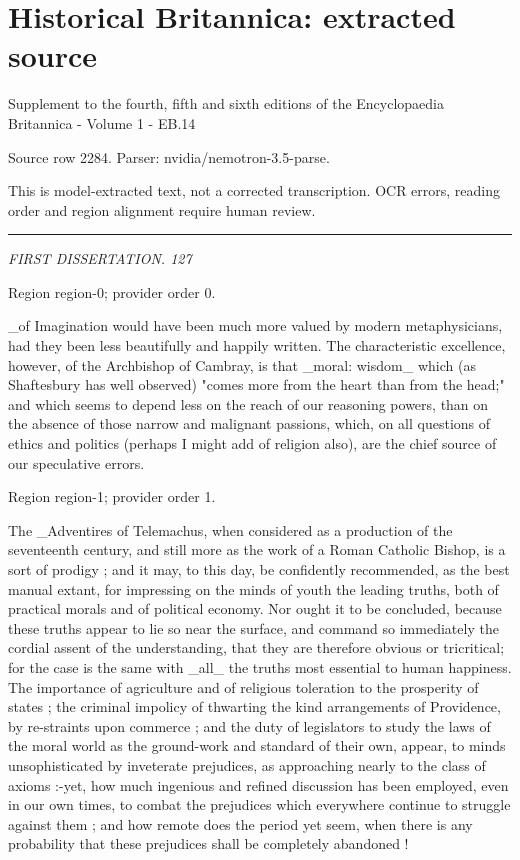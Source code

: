 \documentclass[11pt]{article}
\begin{document}
\section*{Historical Britannica: extracted source}
Supplement to the fourth, fifth and sixth editions of the Encyclopaedia Britannica - Volume 1 - EB.14\par
{\small Source row 2284. Parser: nvidia/nemotron-3.5-parse.\par}
{\small This is model-extracted text, not a corrected transcription. OCR errors, reading order and region alignment require human review.\par}
\hrule\medskip
{\small\itshape FIRST DISSERTATION. 127\par}

{\scriptsize\color{gray} Region region-0; provider order 0.\par}
\medskip

\_of Imagination would have been much more valued by modern metaphysicians, had they been less beautifully and happily written. The characteristic excellence, however, of the Archbishop of Cambray, is that \_moral: wisdom\_ which (as Shaftesbury has well observed) "comes more from the heart than from the head;" and which seems to depend less on the reach of our reasoning powers, than on the absence of those narrow and malignant passions, which, on all questions of ethics and politics (perhaps I might add of religion also), are the chief source of our speculative errors.
\par

{\scriptsize\color{gray} Region region-1; provider order 1.\par}
\medskip

The \_Adventires of Telemachus, when considered as a production of the seventeenth cen­tury, and still more as the work of a Roman Catholic Bishop, is a sort of prodigy ; and it may, to this day, be confidently recommended, as the best manual extant, for impressing on the minds of youth the leading truths, both of practical morals and of political economy. Nor ought it to be concluded, because these truths appear to lie so near the surface, and command so immediately the cordial assent of the understanding, that they are therefore obvious or tricritical; for the case is the same with \_all\_ the truths most essential to human happiness. The importance of agriculture and of religious toleration to the prosperity of states ; the criminal impolicy of thwarting the kind arrangements of Providence, by re-straints upon commerce ; and the duty of legislators to study the laws of the moral world as the ground-work and standard of their own, appear, to minds unsophisticated by inveterate prejudices, as approaching nearly to the class of axioms :-yet, how much ingenious and refined discussion has been employed, even in our own times, to combat the preju­dices which everywhere continue to struggle against them ; and how remote does the pe­riod yet seem, when there is any probability that these prejudices shall be completely abandoned !
\par
\end{document}
